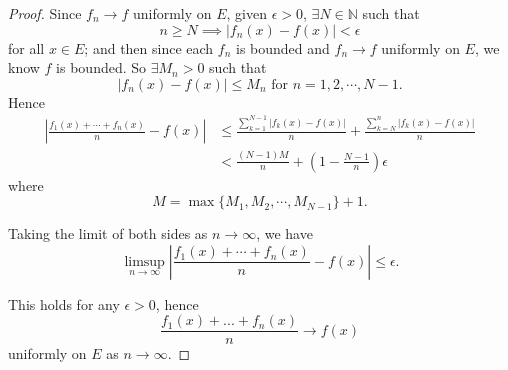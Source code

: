 \begin{Exercise}
\begin{proof}
Since $f_n\to f$ uniformly on $E$, given $\epsilon > 0$, $\exists N\in\mathbb{N}$ such that $$n\geq N \implies \left| f_n(x)-f(x) \right| < \epsilon$$ for all $x\in E$; and then since each $f_n$ is bounded and $f_n\to f$ uniformly on $E$, we know $f$ is bounded. So $\exists M_n > 0$ such that 
$$
\left| f_n(x)-f(x) \right| 
\leq M_n\mbox{ for } n=1,2,\cdots,N-1.
$$
Hence 
\begin{align*}
\left| \frac{f_1(x)+\cdots+f_n(x)}{n}-f(x) \right| 
&\leq \frac{\sum_{k=1}^{N-1}\left| f_k(x)-f(x) \right|}{n} + \frac{\sum_{k=N}^{n}\left| f_k(x)-f(x) \right|}{n} \\
&< \frac{(N-1)M}{n} + \left( 1-\frac{N-1}{n} \right) \epsilon
\end{align*}
where 
$$ 
M = \max\{M_1,M_2,\cdots,M_{N-1}\}+1.
$$

Taking the limit of both sides as $n\to\infty$, we have
$$ 
\limsup_{n\to\infty}\left| \frac{f_1(x)+\cdots+f_n(x)}{n}-f(x) \right| 
\leq \epsilon.
$$

This holds for any $\epsilon > 0$, hence
$$
\frac{f_1(x)+...+f_n(x)}{n}\to f(x)
$$ 
uniformly on $E$ as $n\to\infty$.
\end{proof}
\end{Exercise}